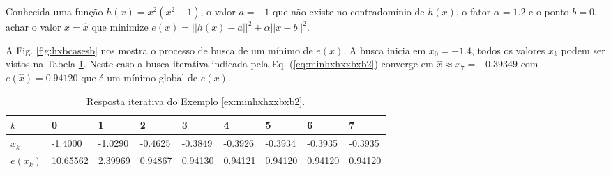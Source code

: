 \begin{example}\label{ex:minhxhxxbxb2}
Conhecida uma função $h(x)=x^2(x^2-1)$, o valor $a=-1$ que não existe no contradomínio de $h(x)$,
o fator $\alpha=1.2$ e o ponto $b=0$,
achar o valor $x=\hat{x}$ que minimize $e(x)=||h(x)-a||^2+\alpha||x-b||^2$.
\end{example}
\begin{SolutionT}\label{sol:minhxhxxbxb2}
 A Fig. \ref{fig:hxbcasesb} nos mostra o processo de busca de um mínimo
 de $e(x)$. A busca inicia em $x_0=-1.4$,
 todos os valores $x_{k}$ podem ser vistos na 
Tabela \ref{tab:hxbcases2}. Neste caso a busca iterativa indicada pela Eq. (\ref{eq:minhxhxxbxb2}) converge
em $\hat{x}\approx x_7=-0.39349$ com $e(\hat{x})=0.94120$ que é um mínimo global de $e(x)$.

\end{SolutionT}

\begin{table}[!h]
\centering
\begin{tabular}{|l|l|l|l|l|l|l|l|l|}
\hline
$k$      & 0 & 1 & 2 & 3 & 4 & 5 & 6 & 7 \\ \hline
$x_k$    & -1.4000 & -1.0290 & -0.4625 & -0.3849 & -0.3926 & -0.3934 & -0.3935 & -0.3935 \\ \hline
$e(x_k)$ & 10.65562 &  2.39969 &  0.94867 &  0.94130 &  0.94121 &  0.94120 &  0.94120 &  0.94120 \\ \hline
\end{tabular}
\caption{Resposta iterativa do Exemplo \ref{ex:minhxhxxbxb2}.}
\label{tab:hxbcases2}
\end{table}


